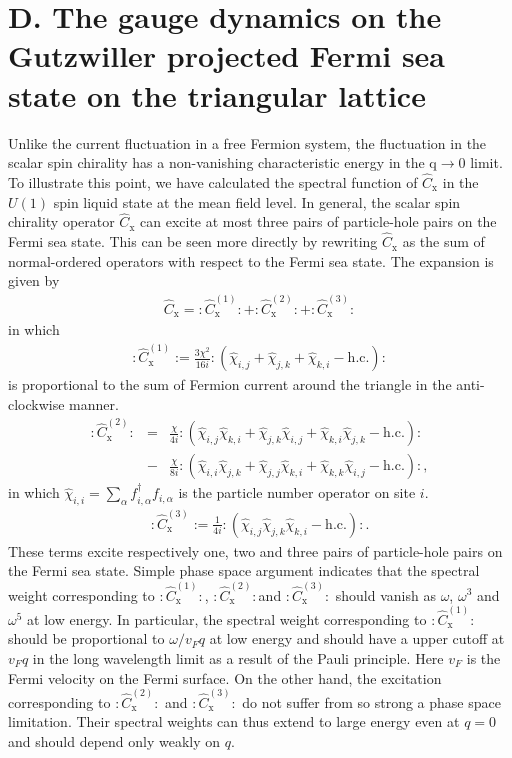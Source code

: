 \documentclass[12pt]{article}
\begin{document}
\section*{D. The gauge dynamics on the Gutzwiller projected Fermi sea state on the triangular lattice}
Unlike the current fluctuation in a free Fermion system, the fluctuation in the scalar spin chirality has a non-vanishing characteristic energy in the $\mathrm{q}\to 0$ limit. To illustrate this point, we have calculated the spectral function of $\hat{C}_{\mathrm{x}}$ in the $U(1)$ spin liquid state at the mean field level. In general, the scalar spin chirality operator $\hat{C}_{\mathrm{x}}$ can excite at most three pairs of particle-hole pairs on the Fermi sea state. This can be seen more directly by rewriting $\hat{C}_{\mathrm{x}}$ as the sum of normal-ordered operators with respect to the Fermi sea state. The expansion is given by
\begin{eqnarray}
\hat{C}_{\mathrm{x}}=:\hat{C}^{(1)}_{\mathrm{x}}:+:\hat{C}^{(2)}_{\mathrm{x}}:+:\hat{C}^{(3)}_{\mathrm{x}}:\nonumber
\end{eqnarray}
in which
\begin{eqnarray}
:\hat{C}^{(1)}_{\mathrm{x}}:=\frac{3\chi^{2}}{16i}:(\hat{\chi}_{i,j}+\hat{\chi}_{j,k}+\hat{\chi}_{k,i}-\mathrm{h. c.}):\nonumber
\end{eqnarray}
is proportional to the sum of Fermion current around the triangle in the anti-clockwise manner. 
\begin{eqnarray}
:\hat{C}^{(2)}_{\mathrm{x}}:&=&\frac{\chi}{4i}:(\hat{\chi}_{i,j}\hat{\chi}_{k,i}+\hat{\chi}_{j,k}\hat{\chi}_{i,j}+\hat{\chi}_{k,i}\hat{\chi}_{j,k}-\mathrm{h. c.}):\nonumber\\
&-&\frac{\chi}{8i}:(\hat{\chi}_{i,i}\hat{\chi}_{j,k}+\hat{\chi}_{j,j}\hat{\chi}_{k,i}+\hat{\chi}_{k,k}\hat{\chi}_{i,j}-\mathrm{h. c.}):,\nonumber
\end{eqnarray}
in which $\hat{\chi}_{i,i}=\sum_{\alpha}f^{\dagger}_{i,\alpha}f_{i,\alpha}$ is the particle number operator on site $i$.
\begin{eqnarray}
:\hat{C}^{(3)}_{\mathrm{x}}:=\frac{1}{4i}:(\hat{\chi}_{i,j}\hat{\chi}_{j,k}\hat{\chi}_{k,i}-\mathrm{h. c.}):\nonumber.
\end{eqnarray}
These terms excite respectively one, two and three pairs of particle-hole pairs on the Fermi sea state.  
Simple phase space argument indicates that the spectral weight corresponding to $:\hat{C}^{(1)}_{\mathrm{x}}:$, $:\hat{C}^{(2)}_{\mathrm{x}}:$and $:\hat{C}^{(3)}_{\mathrm{x}}:$ should vanish as $\omega$, $\omega^{3}$ and $\omega^{5}$ at low energy. In particular, the spectral weight corresponding to $:\hat{C}^{(1)}_{\mathrm{x}}:$ should be proportional to $\omega/v_{F}q$ at low energy and should have a upper cutoff at $v_{F}q$ in the long wavelength limit as a result of the Pauli principle. Here $v_{F}$ is the Fermi velocity on the Fermi surface. On the other hand, the excitation corresponding to $:\hat{C}^{(2)}_{\mathrm{x}}:$ and $:\hat{C}^{(3)}_{\mathrm{x}}:$ do not suffer from so strong a phase space limitation. Their spectral weights can thus extend to large energy even at $q=0$ and should depend only weakly on $q$. 
\end{document}
